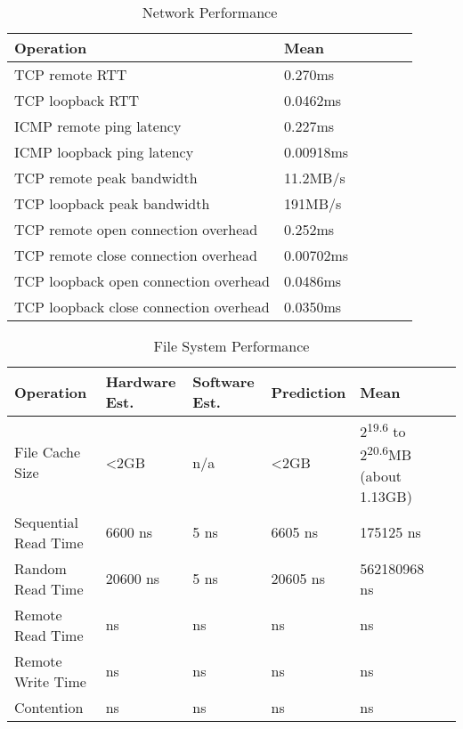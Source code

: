 \documentclass{article} %
\begin{document}
\begin{table}[!htbp]
  \caption{Network Performance}
  \begin{center}
  \begin{tabular}{|l|l|l|l|l|l|}
    \hline
    Operation                              & Mean      \\ \hline
    TCP remote RTT                         & 0.270ms   \\ \hline
    TCP loopback RTT                       & 0.0462ms  \\ \hline
    ICMP remote ping latency               & 0.227ms   \\ \hline
    ICMP loopback ping latency             & 0.00918ms \\ \hline
    TCP remote peak bandwidth              & 11.2MB/s  \\ \hline
    TCP loopback peak bandwidth            & 191MB/s   \\ \hline
    TCP remote open connection overhead    & 0.252ms   \\ \hline
    TCP remote close connection overhead   & 0.00702ms \\ \hline
    TCP loopback open connection overhead  & 0.0486ms  \\ \hline
    TCP loopback close connection overhead & 0.0350ms  \\ \hline
  \end{tabular}
  \end{center}
  \label{table:overview_network}
\end{table}

\begin{table}[!htbp]
  \caption{File System Performance}
  \begin{tabular}{|l|l|l|l|l|l|}
    \hline
    Operation               & Hardware Est.         & Software Est.         & Prediction            & Mean     \\ \hline
    File Cache Size         & \textless2GB          & n/a                   & \textless2GB          & 2\textsuperscript{19.6} to 2\textsuperscript{20.6}MB (about 1.13GB)\\ \hline
    Sequential Read Time    & 6600 ns               & 5 ns                  & 6605 ns               & 175125 ns\\ \hline
    Random Read Time        & 20600 ns              & 5 ns                  & 20605 ns              & 562180968 ns\\ \hline
    Remote Read Time        & ns                    & ns                    & ns                    & ns\\ \hline
    Remote Write Time       & ns                    & ns                    & ns                    & ns\\ \hline
    Contention              & ns                    & ns                    & ns                    & ns\\ \hline
  \end{tabular}
  \label{table:overview_file}
\end{table}
\end{document}

